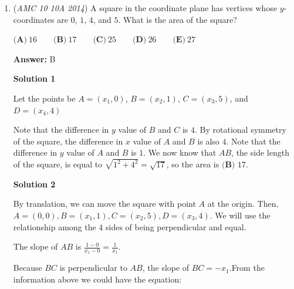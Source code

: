 \begin{enumerate}
 
            \begin{itemize}
        \item If the sum is 5, there are $4$ ways (namely $(1, 4)$, $(4, 1)$, $(2, 3)$, and $(3, 2)$).
        \item If the sum is 6, there are $5$ ways (namely $(1, 5)$, $(5, 1)$, $(2, 4)$, $(4, 2)$, and $(3, 3)$).
            \end{itemize}
            We have exhausted all cases because there is no way a dice can roll a $7$. Summing, there are 15 ways here.To summarize: there are $3$ ways to pick the dice that is the sum, and $15$ ways to achieve the sum, for a total of $45$ configurations. There are $6\cdot6\cdot6=216$ total configurations, and the probability is $\frac{45}{216}=\frac{5}{24} \Longrightarrow \boxed{\textbf{(D)} \frac{5}{24}}$.

 


	\item (\textit{AMC 10 10A 2014}) A square in the coordinate plane has vertices whose $y$-coordinates are $0$, $1$, $4$, and $5$. What is the area of the square?


 $\textbf{(A)}\ 16\qquad\textbf{(B)}\ 17\qquad\textbf{(C)}\ 25\qquad\textbf{(D)}\ 26\qquad\textbf{(E)}\ 27$

 \textbf{Answer: }B



\textbf{Solution 1}

Let the points be $A=(x_1,0)$, $B=(x_2,1)$, $C=(x_3,5)$, and $D=(x_4,4)$

 Note that the difference in $y$ value of $B$ and $C$ is $4$. By rotational symmetry of the square, the difference in $x$ value of $A$ and $B$ is also $4$. Note that the difference in $y$ value of $A$ and $B$ is $1$. We now know that $AB$, the side length of the square, is equal to $\sqrt{1^2+4^2}=\sqrt{17}$, so the area is $\boxed{\textbf{(B) }17}$.

 



\textbf{Solution 2}

By translation, we can move the square with point $A$ at the origin. Then, $A=(0,0), B=(x_1,1), C=(x_2,5), D=(x_3,4)$. We will use the relationship among the 4 sides of being perpendicular and equal.

 The slope of $AB$ is $\frac{1-0}{x_1-0}=\frac{1}{x_1}$. 

 Because $BC$ is perpendicular to $AB$, the slope of $BC=-x_1$.From the information above we could have the equation: 


\end{enumerate}
